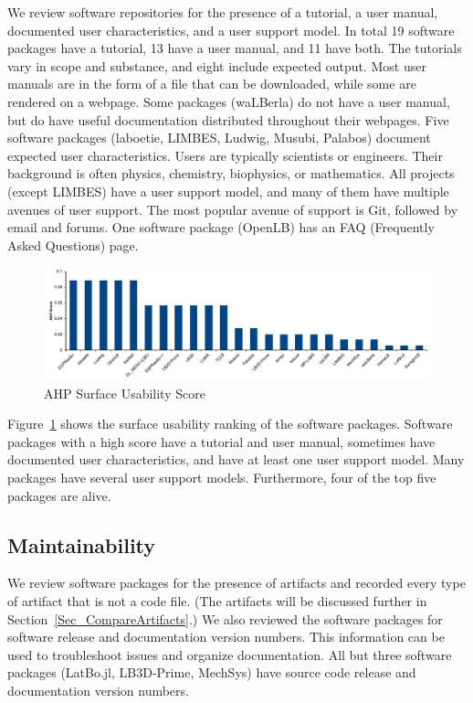 \documentclass[final, 3p, times, authoryear]{elsarticle}
\begin{document}
We review software repositories for the presence of a tutorial, a user manual,
documented user characteristics, and a user support model. In total 19 software
packages have a tutorial, 13 have a user manual, and 11 have both. The tutorials
vary in scope and substance, and eight include expected output. Most user
manuals are in the form of a file that can be downloaded, while some are
rendered on a webpage. Some packages (waLBerla) do not have a user manual, but
do have useful documentation distributed throughout their webpages. Five
software packages (laboetie, LIMBES, Ludwig, Musubi, Palabos) document expected
user characteristics. Users are typically scientists or engineers. Their
background is often physics, chemistry, biophysics, or mathematics. All projects
(except LIMBES) have a user support model, and many of them have multiple
avenues of user support. The most popular avenue of support is Git, followed by
email and forums. One software package (OpenLB) has an FAQ (Frequently Asked
Questions) page.    

\begin{figure}[h!]
	\begin{center}
		\includegraphics[width=1.0\textwidth]{./figures/usability_chart.pdf}
		\caption{AHP Surface Usability Score}
		\label{Fig_Usability}
	\end{center}
\end{figure}

Figure~\ref{Fig_Usability} shows the surface usability ranking of the software
packages. Software packages with a high score have a tutorial and user manual,
sometimes have documented user characteristics, and have at least one user
support model. Many packages have several user support models. Furthermore, four
of the top five packages are alive. 

\subsection{Maintainability} \label{Sec_Maintainability}

We review software packages for the presence of artifacts and recorded every
type of artifact that is not a code file. (The artifacts will be discussed
further in Section~\ref{Sec_CompareArtifacts}.)  We also reviewed the software
packages for software release and documentation version numbers. This
information can be used to troubleshoot issues and organize documentation. All
but three software packages (LatBo.jl, LB3D-Prime, MechSys) have source code
release and documentation version numbers.
\end{document}
